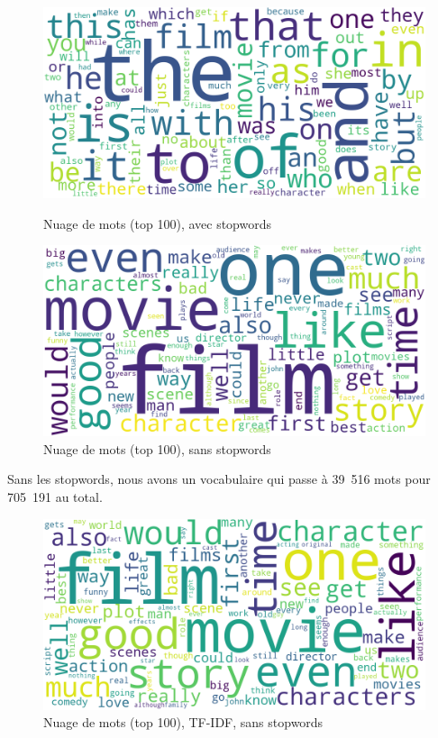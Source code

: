 \documentclass{article}
\begin{document}
\begin{figure}[H]
    \centering
    \begin{minipage}[b]{0.48\textwidth}
        \includegraphics[width=\textwidth]{./src/movies/wordclouds_nostopwords.png}
        \caption{Nuage de mots (top 100), avec stopwords}
        \label{wordcloud_nostopwords_movies}
    \end{minipage}
    \hfill
    \begin{minipage}[b]{0.48\textwidth}
        \includegraphics[width=\textwidth]{./src/movies/wordclouds_stopwords.png}
        \caption{Nuage de mots (top 100), sans stopwords}
        \label{wordcloud_stopwords_movies}
    \end{minipage}
\end{figure}

Sans les stopwords, nous avons un vocabulaire qui passe à 39~516 mots pour 705~191 au total.

\begin{figure}[H]
    \centering
    \includegraphics[width=\textwidth]{./src/movies/wordclouds_stopwords_tfidf.png}
    \caption{Nuage de mots (top 100), TF-IDF, sans stopwords}
    \label{wordcloud_stopwords_tf_idf_movies}
\end{figure}
\end{document}
